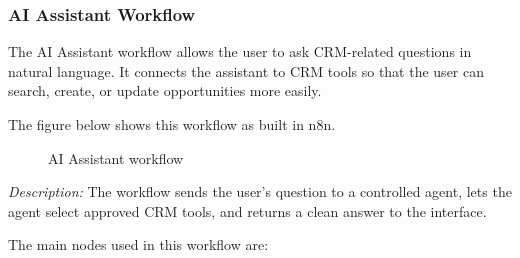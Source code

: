 \documentclass[12pt,a4paper,oneside]{report}
\newcommand{\figdesc}[1]{%
\vspace{-0.05cm}\noindent\small\textit{Description:} #1\par\normalsize\vspace{0.30cm}%
}
\begin{document}
\subsubsection{AI Assistant Workflow}

The AI Assistant workflow allows the user to ask CRM-related questions in natural language. It connects the assistant to CRM tools so that the user can search, create, or update opportunities more easily.

The figure below shows this workflow as built in n8n.

\begin{figure}[H]
\centering
{}
\caption{AI Assistant workflow}
\label{fig:ai assistant workflow}
\end{figure}
\figdesc{The workflow sends the user's question to a controlled agent, lets the agent select approved CRM tools, and returns a clean answer to the interface.}


The main nodes used in this workflow are:
\end{document}
